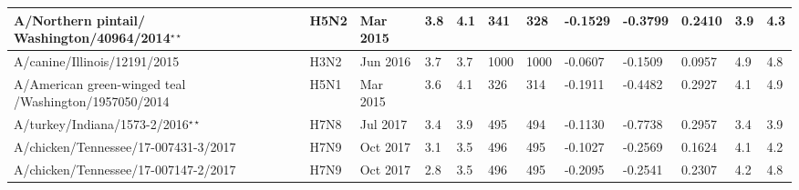 \begin{tabular}{L{1.25in}|L{.35in}|L{.3in}|L{.3in}|L{.3in}|L{.35in}|L{.35in}|L{.35in}|L{.35in}|L{.32in}|L{.3in}|L{.3in}}
 A/Northern  pintail/ Washington/40964/2014$^{\star\star}$ &H5N2& Mar  2015 &3.8&4.1&341&328&-0.1529&-0.3799&0.2410&3.9&4.3\\\hline
 A/canine/Illinois/12191/2015 &H3N2& Jun  2016 &3.7&3.7&1000&1000&-0.0607&-0.1509&0.0957&4.9&4.8\\\hline
 A/American  green-winged  teal /Washington/1957050/2014 &H5N1& Mar 2015 &3.6&4.1&326&314&-0.1911&-0.4482&0.2927&4.1&4.9\\\hline
 A/turkey/Indiana/1573-2/2016$^{\star\star}$ &H7N8& Jul  2017 &3.4&3.9&495&494&-0.1130&-0.7738&0.2957&3.4&3.9\\\hline
 A/chicken/Tennessee/17-007431-3/2017 &H7N9& Oct  2017 &3.1&3.5&496&495&-0.1027&-0.2569&0.1624&4.1&4.2\\\hline
 A/chicken/Tennessee/17-007147-2/2017 &H7N9& Oct  2017 &2.8&3.5&496&495&-0.2095&-0.2541&0.2307&4.2&4.8\\\hline
 \end{tabular}